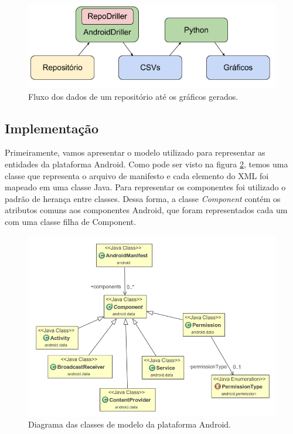 \documentclass[a4paper,12pt]{article}
\begin{document}
 \begin{figure}[h]
 \centering
 \includegraphics[width=0.65\linewidth]{imgs/workflow.png}
 \caption{Fluxo dos dados de um repositório até os gráficos gerados.}
 \label{fig:workflow}
 \end{figure}



\subsection{Implementação}%
\label{sec:implementacao}


Primeiramente, vamos apresentar o modelo utilizado para representar as entidades da plataforma Android. Como pode ser visto na figura \ref{fig:model}, temos uma classe que representa o arquivo de manifesto e cada elemento do XML foi mapeado em uma classe Java. Para representar os componentes foi utilizado o padrão de herança entre classes. Dessa forma, a classe \textit{Component} contém os atributos comuns aos componentes Android, que foram representados cada um com uma classe filha de Component.\\

\begin{figure}[H]
\centering
\includegraphics[width=0.8\linewidth]{imgs/model.png}
\caption{Diagrama das classes de modelo da plataforma Android.}
\label{fig:model}
\end{figure}
\end{document}
